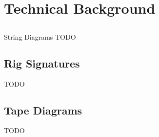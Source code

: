 \documentclass{article}
\begin{document}
\section{Technical Background}

\subsection{}{String Diagrams}
TODO
\subsection{Rig Signatures}
TODO
\subsection{Tape Diagrams}
TODO
\end{document}

